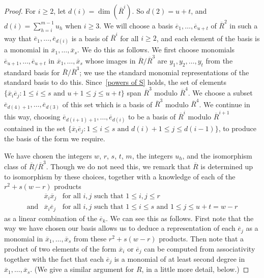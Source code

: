 \documentclass[12pt]{article}
\begin{document}
\begin{proof}
For $i\geq 2$, let $d(i)=\dim(\overline{R}^{i})$. So  $d(2)=u+t$, and $d(i) = \sum_{h=i}^{m-1}u_h$ when $i\geq 3$. We will choose a basis $\overline{e}_{1}, \ldots, \overline{e}_{u+t}$ of $\overline{R}^{2}$ in such a way that $\overline{e}_{1}, \ldots , \overline{e}_{d(i)}$ is a basis of $\overline{R}^{i}$ for all $i\geq 2$, and each element of the basis is a monomial in $\overline{x}_{1}, \ldots, \overline{x}_{s}$. We do this as follows. We first choose monomials $\overline{e}_{u+1}, \ldots, \overline{e}_{u+t}$ in $\overline{x}_{1}, \ldots, \overline{x}_{s}$ whose images in $\overline{R}/\overline{R}^3$ are $y_1,y_2,\ldots,y_t$ from the standard basis for $\overline{R}/\overline{R}^3$; we use the standard monomial representations of the standard basis to do this. Since~\eqref{powers of S} holds, the set of elements $\{\overline{x}_i\overline{e}_j:1\leq i\leq s\text{ and }u+1\leq j\leq u+t\}$ span $\overline{R}^3$ modulo $\overline{R}^4$. We choose a subset $\overline{e}_{d(4)+1}, \ldots , \overline{e}_{d(3)}$ of this set which is a basis of $\overline{R}^3$ modulo $\overline{R}^4$. We continue in this way, choosing $\overline{e}_{d(i+1)+1}, \ldots , \overline{e}_{d(i)}$ to be a basis of $\overline{R}^i$ modulo $\overline{R}^{i+1}$ contained in the set $\{\overline{x}_i\overline{e}_j:1\leq i\leq s\text{ and }d(i)+1\leq j\leq d(i-1)\}$, to produce the basis of the form we require.

We have chosen the integers $w$, $r$, $s$, $t$, $m$, the integers $u_h$, and the isomorphism class of $\overline{R}/\overline{R}^3$. 
Though we do not need this, we remark that $\overline{R}$ is determined up to isomorphism by these choices, together with a knowledge of each of the $r^{2} + s(w - r)$ products 
\begin{eqnarray*}
{} & \overline{x}_{i}\overline{x}_{j} & \textrm{for all $i,j$ such that $1 \leq i, j \leq r$} \\
\textrm{and} & \overline{x}_{i}\overline{e}_{j} & \textrm{for all $i, j$ such that $1 \leq i \leq s$ and $1 \leq j \leq u + t = w - r$}
\end{eqnarray*}
as a linear combination of the $\overline{e}_{k}$. We can see this as follows. First note that the way we have chosen our basis allows us to deduce a representation of each $\overline{e}_j$ as a monomial in $\overline{x}_1,\ldots, \overline{x}_s$ from these $r^{2} + s(w - r)$ products. Then note that a product of two elements of the form $\overline{x}_i$ or $\overline{e}_j$ can be computed from associativity together with the fact that each $\overline{e}_{j}$ is a monomial of at least second degree in $\overline{x}_{1}, \ldots, \overline{x}_{s}$. (We give a similar argument for $R$, in a little more detail, below.)


\end{proof}
\end{document}
